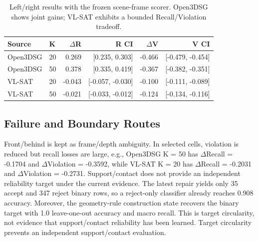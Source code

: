 \documentclass[letterpaper]{article} %
\begin{document}
\begin{table}[t]
\centering
\scriptsize
\setlength{\tabcolsep}{2.5pt}
\begin{tabular}{llrrrr}
\toprule
Source & K & $\Delta$R & R CI & $\Delta$V & V CI \\
\midrule
Open3DSG & 20 & 0.269 & [0.235, 0.303] & -0.466 & [-0.479, -0.454] \\
Open3DSG & 50 & 0.378 & [0.335, 0.419] & -0.367 & [-0.382, -0.351] \\
VL-SAT & 20 & -0.043 & [-0.057, -0.030] & -0.100 & [-0.111, -0.089] \\
VL-SAT & 50 & -0.021 & [-0.033, -0.012] & -0.124 & [-0.134, -0.116] \\
\bottomrule
\end{tabular}
\caption{Left/right results with the frozen scene-frame scorer. Open3DSG shows
joint gains; VL-SAT exhibits a bounded Recall/Violation tradeoff.}
\label{tab:left-right}
\end{table}

\subsection{Failure and Boundary Routes}

Front/behind is kept as frame/depth ambiguity. In selected cells, violation is
reduced but recall losses are large, e.g., Open3DSG K = 50 has
$\Delta$Recall = -0.1704 and $\Delta$Violation = -0.3592, while VL-SAT K = 20
has $\Delta$Recall = -0.2031 and $\Delta$Violation = -0.2731.
Support/contact does not provide an independent reliability target under the
current evidence. The latest repair yields only 35 accept and 347 reject binary
rows, so a reject-only classifier already reaches 0.908 accuracy.
Moreover, the geometry-rule construction state recovers the binary target with
1.0 leave-one-out accuracy and macro recall. This is target circularity, not
evidence that support/contact reliability has been learned. Target circularity
prevents an independent support/contact evaluation.
\end{document}
